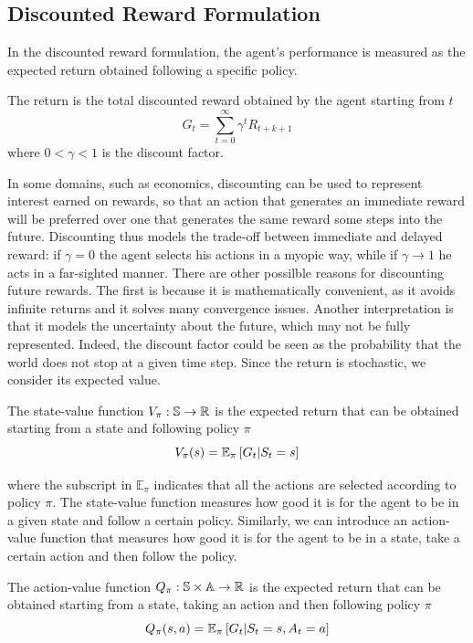 \subsection{Discounted Reward Formulation}
In the discounted reward formulation, the agent's performance is measured as
the expected return obtained following a specific policy.
\begin{definition}[Return]
	The return is the total discounted reward obtained by the agent starting 
	from $t$  
	\begin{equation*}
		G_t = \sum^{\infty}_{t=0} \gamma^t R_{t+k+1} 
	\end{equation*}
	where $0 < \gamma < 1$ is the discount factor.
\end{definition}
In some domains, such as economics, discounting can be used to represent
interest earned on rewards, so that an action that generates an immediate
reward will be preferred over one that generates the same reward some steps
into the future. Discounting thus models the trade-off between immediate and
delayed reward: if $\gamma = 0$ the agent selects his actions in a myopic way,
while if $\gamma \to 1$ he acts in a far-sighted manner. There are other
possilble reasons for discounting future rewards. The first is because it is
mathematically convenient, as it avoids infinite returns and it solves many
convergence issues. Another interpretation is that it models the uncertainty
about the future, which may not be fully represented. Indeed, the discount
factor could be seen as the probability that the world does not stop at a given 
time step. Since the return is stochastic, we consider its expected value.  
\begin{definition}
	The state-value function $V_\pi: \S \to \R$ is the expected return that can
	be obtained starting from a state and following policy $\pi$
	\begin{equation}
		V_\pi(s) = \E[\pi]{G_t|S_t = s}
	\end{equation}
\end{definition}
where the subscript in $\mathbb{E}_{\pi}$ indicates that all the actions are selected according to policy $\pi$. The state-value function measures how good it is for the agent to be in a given state and follow a certain policy. Similarly, we can introduce an action-value function that measures how good it is for the agent to be in a state, take a certain action and then follow the policy. 
\begin{definition}
	The action-value function $Q_\pi: \S \times \A \to \R$ is the expected 
	return that can be obtained starting from a state, taking an action and
	then following policy $\pi$
	\begin{equation}
		Q_\pi(s,a) = \E[\pi]{G_t|S_t = s, A_t = a}
	\end{equation}
\end{definition}
